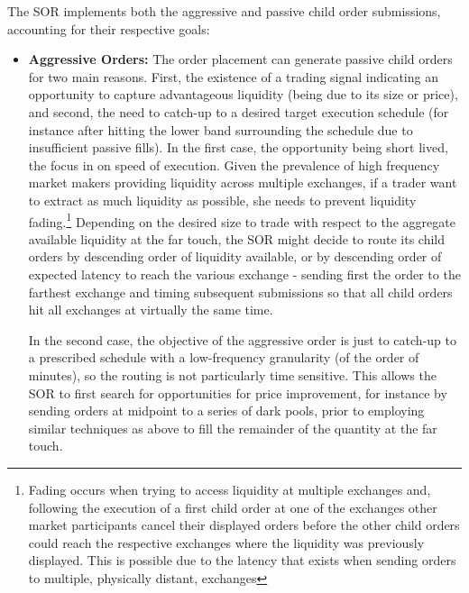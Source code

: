 The SOR implements both the aggressive and passive child order submissions, accounting for their respective goals:

\begin{itemize}
\item \textbf{Aggressive Orders:} The order placement can generate passive child orders for two main reasons. First, the existence of a trading signal indicating an opportunity to capture advantageous liquidity (being due to its size or price), and second, the need to catch-up to a desired target execution schedule (for instance after hitting the lower band surrounding the schedule due to insufficient passive fills). In the first case, the opportunity being short lived, the focus in on speed of execution. Given the prevalence of high frequency market makers providing liquidity across multiple exchanges, if a trader want to extract as much liquidity as possible, she needs to prevent liquidity fading.\footnote{Fading occurs when trying to access liquidity at multiple exchanges and, following the execution of a first child order at one of the exchanges other market participants cancel their displayed orders before the other child orders could reach the respective exchanges where the liquidity was previously displayed. This is possible due to the latency that exists when sending orders to multiple, physically distant, exchanges} Depending on the desired size to trade with respect to the aggregate available liquidity at the far touch, the SOR might decide to route its child orders by descending order of liquidity available, or by descending order of expected latency to reach the various exchange - sending first the order to the farthest exchange and timing subsequent submissions so that all child orders hit all exchanges at virtually the same time. 


In the second case, the objective of the aggressive order is just to catch-up to a prescribed schedule with a low-frequency granularity (of the order of minutes), so the routing is not particularly time sensitive. This allows the SOR to first search for opportunities for price improvement, for instance by sending orders at midpoint to a series of dark pools, prior to employing similar techniques as above to fill the remainder of the quantity at the far touch.



\end{itemize}
